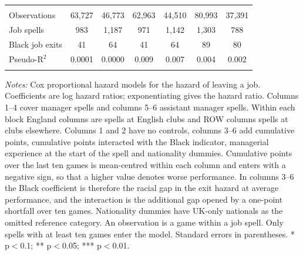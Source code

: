 \begin{table}[!htbp]
\begin{threeparttable}
\begin{tabular}{lcccccc}
\hline \\[-1.8ex]
Observations & 63,727 & 46,773 & 62,963 & 44,510 & 80,993 & 37,391 \\ 
Job spells & 983 & 1,187 & 971 & 1,142 & 1,303 & 788 \\ 
Black job exits & 41 & 64 & 41 & 64 & 89 & 80 \\ 
Pseudo-R$^{2}$ & 0.0001 & 0.0000 & 0.009 & 0.007 & 0.004 & 0.002 \\ 
\hline
\hline \\[-1.8ex]
\end{tabular}
\begin{tablenotes}[flushleft]
\item[] \scriptsize \textit{Notes:} Cox proportional hazard models for the hazard of leaving a job. Coefficients are log hazard ratios; exponentiating gives the hazard ratio. Columns 1--4 cover manager spells and columns 5--6 assistant manager spells. Within each block England columns are spells at English clubs and ROW columns spells at clubs elsewhere. Columns 1 and 2 have no controls, columns 3--6 add cumulative points, cumulative points interacted with the Black indicator, managerial experience at the start of the spell and nationality dummies. Cumulative points over the last ten games is mean-centred within each column and enters with a negative sign, so that a higher value denotes worse performance. In columns 3--6 the Black coefficient is therefore the racial gap in the exit hazard at average performance, and the interaction is the additional gap opened by a one-point shortfall over ten games. Nationality dummies have UK-only nationals as the omitted reference category. An observation is a game within a job spell. Only spells with at least ten games enter the model. Standard errors in parentheses. * p$<$0.1; ** p$<$0.05; *** p$<$0.01.
\end{tablenotes}
\end{threeparttable}
\end{table}
